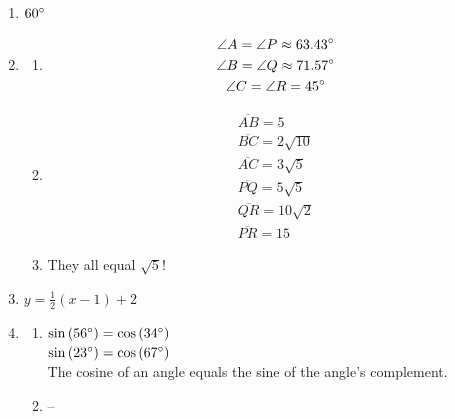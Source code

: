 \documentclass{article}
\begin{document}
\begin{enumerate}
\begin{enumerate}
	\item $\vec{v} - \vec{u}$
	
	\item $\vec{MN} = \frac{17}{100} \vec{BC}$
	
	\end{enumerate}
	
\item $60 \degree$

\item

	\begin{enumerate}
	
	\item \begin{gather*}
		\angle A = \angle P \approx 63.43\degree \\
		\angle B = \angle Q \approx 71.57\degree \\
		\angle C = \angle R = 45\degree
		\end{gather*}
		
	\item \begin{gather*}
		\overline{AB} = 5 \\
		\overline{BC} = 2\sqrt{10} \\
		\overline{AC} = 3\sqrt{5} \\
		\overline{PQ} = 5\sqrt{5} \\
		\overline{QR} = 10\sqrt{2} \\
		\overline{PR} = 15
		\end{gather*}
		
	\item They all equal $\sqrt{5}$!
	
	\end{enumerate}
	
\item $y = \frac{1}{2}(x - 1) + 2$

\item 

	\begin{enumerate}
	
	\item $\sin{(56\degree)} = \cos{(34\degree)}$ \\
		$\sin{(23\degree)} = \cos{(67\degree)}$ \\
		The cosine of an angle equals the sine of the angle's complement.
		
	\item --
	
	\end{enumerate}
	

\end{enumerate}
\end{document}
